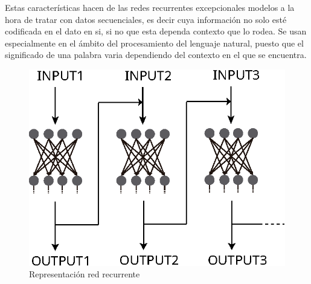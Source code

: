 
Estas características hacen de las redes recurrentes excepcionales modelos a la
hora de tratar con datos secuenciales, es decir cuya información no solo esté
codificada en el dato en si, si no que esta dependa contexto que lo rodea. Se
usan especialmente en el ámbito del procesamiento del lenguaje natural, puesto
que el significado de una palabra varia dependiendo del contexto en el que se
encuentra. 

\begin{figure}[H]
	\includegraphics[scale=1.15]{imagenes/DIagramaRedRecurrente.eps}
	\centering
	\captionsetup{justification=centering}
    \caption{Representación red recurrente}
    \label{Representación red recurrente}
\end{figure}
